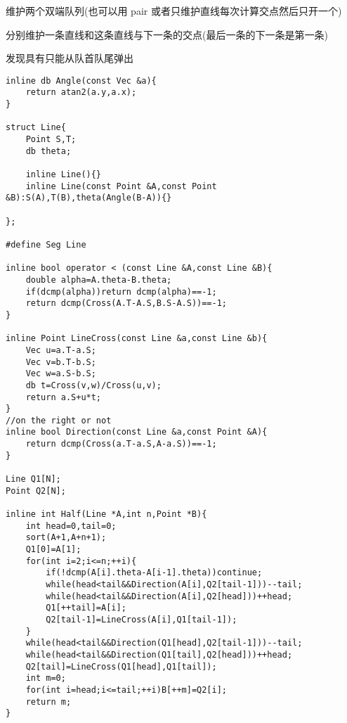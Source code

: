 \documentclass{ctexart}
\begin{document}
维护两个双端队列(也可以用 pair 或者只维护直线每次计算交点然后只开一个)

分别维护一条直线和这条直线与下一条的交点(最后一条的下一条是第一条)

发现具有只能从队首队尾弹出
\begin{lstlisting}
inline db Angle(const Vec &a){
	return atan2(a.y,a.x);
}

struct Line{
	Point S,T;
	db theta;
	
	inline Line(){}
	inline Line(const Point &A,const Point &B):S(A),T(B),theta(Angle(B-A)){}
	
};

#define Seg Line

inline bool operator < (const Line &A,const Line &B){
	double alpha=A.theta-B.theta;
	if(dcmp(alpha))return dcmp(alpha)==-1;
	return dcmp(Cross(A.T-A.S,B.S-A.S))==-1;
}

inline Point LineCross(const Line &a,const Line &b){
	Vec u=a.T-a.S;
	Vec v=b.T-b.S;
	Vec w=a.S-b.S;
	db t=Cross(v,w)/Cross(u,v);
	return a.S+u*t;
}
//on the right or not
inline bool Direction(const Line &a,const Point &A){
	return dcmp(Cross(a.T-a.S,A-a.S))==-1;
}

Line Q1[N];
Point Q2[N];

inline int Half(Line *A,int n,Point *B){
	int head=0,tail=0;
	sort(A+1,A+n+1);
	Q1[0]=A[1];
	for(int i=2;i<=n;++i){
		if(!dcmp(A[i].theta-A[i-1].theta))continue;
		while(head<tail&&Direction(A[i],Q2[tail-1]))--tail;
		while(head<tail&&Direction(A[i],Q2[head]))++head;
		Q1[++tail]=A[i];
		Q2[tail-1]=LineCross(A[i],Q1[tail-1]);
	}
	while(head<tail&&Direction(Q1[head],Q2[tail-1]))--tail;
	while(head<tail&&Direction(Q1[tail],Q2[head]))++head;
	Q2[tail]=LineCross(Q1[head],Q1[tail]);
	int m=0;
	for(int i=head;i<=tail;++i)B[++m]=Q2[i];
	return m;
}
\end{lstlisting}
\end{document}
